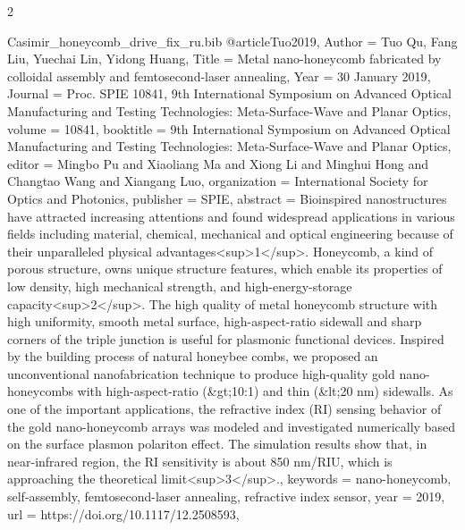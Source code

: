 \documentclass[twoside, 10pt]{article}
\def\myfilename{Casimir_honeycomb_drive_fix_ru}
\begin{document}
\begin{multicols}{2}
\begin{filecontents}{\myfilename.bib}
@article{Tuo2019,
    Author = {Tuo Qu, Fang Liu, Yuechai Lin, Yidong Huang},
    Title = {Metal nano-honeycomb fabricated by colloidal assembly and femtosecond-laser annealing},
    Year = {30 January 2019},
    Journal = {Proc. SPIE 10841, 9th International Symposium on Advanced Optical Manufacturing and Testing Technologies: Meta-Surface-Wave and Planar Optics},
    volume = {10841},
    booktitle = {9th International Symposium on Advanced Optical Manufacturing and Testing Technologies: Meta-Surface-Wave and Planar Optics},
    editor = {Mingbo Pu and Xiaoliang Ma and Xiong Li and Minghui Hong and Changtao Wang and Xiangang Luo},
    organization = {International Society for Optics and Photonics},
    publisher = {SPIE},
    abstract = {Bioinspired nanostructures have attracted increasing attentions and found widespread applications in various fields including material, chemical, mechanical and optical engineering because of their unparalleled physical advantages<sup>1</sup>. Honeycomb, a kind of porous structure, owns unique structure features, which enable its properties of low density, high mechanical strength, and high-energy-storage capacity<sup>2</sup>. The high quality of metal honeycomb structure with high uniformity, smooth metal surface, high-aspect-ratio sidewall and sharp corners of the triple junction is useful for plasmonic functional devices. Inspired by the building process of natural honeybee combs, we proposed an unconventional nanofabrication technique to produce high-quality gold nano-honeycombs with high-aspect-ratio (&gt;10:1) and thin (&lt;20 nm) sidewalls. As one of the important applications, the refractive index (RI) sensing behavior of the gold nano-honeycomb arrays was modeled and investigated numerically based on the surface plasmon polariton effect. The simulation results show that, in near-infrared region, the RI sensitivity is about 850 nm/RIU, which is approaching the theoretical limit<sup>3</sup>.},
    keywords = {nano-honeycomb, self-assembly, femtosecond-laser annealing, refractive index sensor},
    year = {2019},
    url = {https://doi.org/10.1117/12.2508593},
}



\end{filecontents}
\end{multicols}
\end{document}
